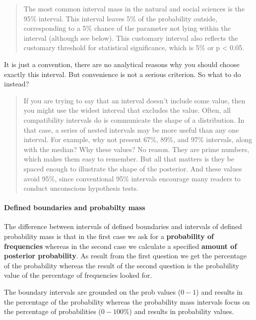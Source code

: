\documentclass[
  letterpaper,
  DIV=11,
  numbers=noendperiod]{scrreprt}
\let\oldparagraph\paragraph
\renewcommand{\paragraph}[1]{\oldparagraph{#1}\mbox{}}
\begin{document}
\begin{quote}
The most common interval mass in the natural and social sciences is the
95\% interval. This interval leaves 5\% of the probability outside,
corresponding to a 5\% chance of the parameter not lying within the
interval (although see below). This customary interval also reflects the
customary threshold for statistical significance, which is 5\% or p
\textless{} 0.05.
\end{quote}

It is just a convention, there are no analytical reasons why you should
choose exactly this interval. But convenience is not a serious
criterion. So what to do instead?

\begin{quote}
If you are trying to say that an interval doesn't include some value,
then you might use the widest interval that excludes the value. Often,
all compatibility intervals do is communicate the shape of a
distribution. In that case, a series of nested intervals may be more
useful than any one interval. For example, why not present 67\%, 89\%,
and 97\% intervals, along with the median? Why these values? No reason.
They are prime numbers, which makes them easy to remember. But all that
matters is they be spaced enough to illustrate the shape of the
posterior. And these values avoid 95\%, since conventional 95\%
intervals encourage many readers to conduct unconscious hypothesis
tests.
\end{quote}

\hypertarget{defined-boundaries-and-probabilty-mass}{%
\paragraph{Defined boundaries and probabilty
mass}\label{defined-boundaries-and-probabilty-mass}}

The difference between intervals of defined boundaries and intervals of
defined probability mass is that in the first case we ask for a
\textbf{probability of frequencies} whereas in the second case we
calculate a specified \textbf{amount of posterior probability}. As
result from the first question we get the percentage of the probability
whereas the result of the second question is the probability value of
the percentage of frequencies looked for.

The boundary intervals are grounded on the prob values (\(0-1\)) and
results in the percentage of the probability whereas the probability
mass intervals focus on the percentage of probabilities (\(0-100\)\%)
and results in probability values.
\end{document}
